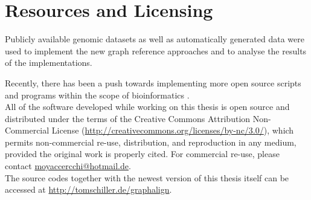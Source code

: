 \documentclass[a4paper,12pt,twoside,BCOR=10mm]{scrbook}
\begin{document}
\section{Resources and Licensing}
%

Publicly available genomic datasets as well as automatically generated data were used
to implement the new graph reference approaches and to analyse the results of the implementations.

Recently, there has been a push towards implementing more open source scripts
and programs within the scope of bioinformatics \citep{MANIFESTO}. \\
All of the software developed while working on this thesis
is open source and distributed under the terms of
the Creative Commons Attribution Non-Commercial License
(\url{http://creativecommons.org/licenses/by-nc/3.0/}),
which permits non-commercial re-use, distribution, and reproduction in any medium,
provided the original work is properly cited.
For commercial re-use, please contact \url{moyaccercchi@hotmail.de}. \\
The source codes together with the newest version of this thesis itself can be accessed at \url{http://tomschiller.de/graphalign}.
%

%
%
%
%
\end{document}
